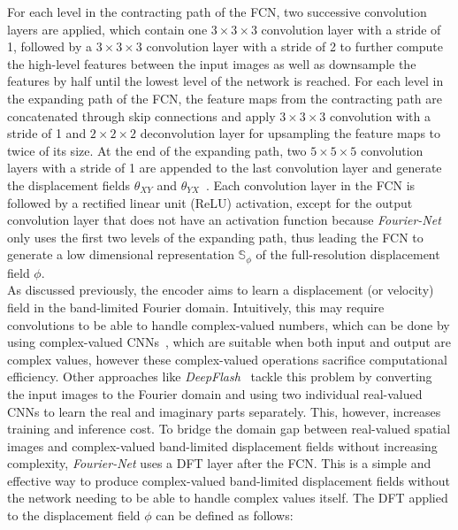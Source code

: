 For each level in the contracting path of the FCN, two successive convolution layers are applied, which contain one $3 \times 3 \times 3$ convolution layer with a stride of 1, followed by a $3 \times 3 \times 3$ convolution layer with a stride of 2 to further compute the high-level features between the input images as well as downsample the features by half until the lowest level of the network is reached. For each level in the expanding path of the FCN, the feature maps from the contracting path are concatenated through skip connections and apply $3 \times 3 \times 3$ convolution with a stride of 1 and $2 \times 2 \times 2$ deconvolution layer for upsampling the feature maps to twice of its size. At the end of the expanding path, two $5 \times 5 \times 5$ convolution layers with a stride of 1 are appended to the last convolution layer and generate the displacement fields $\theta_{XY}$ and $\theta_{YX}$~\cite{SYM-Net}. Each convolution layer in the FCN is followed by a rectified linear unit (ReLU) activation, except for the output convolution layer that does not have an activation function because \emph{Fourier-Net} only uses the first two levels of the expanding path, thus leading the FCN to generate a low dimensional representation $\mathbb{S}_\phi$ of the full-resolution displacement field $\phi$.\\
As discussed previously, the encoder aims to learn a displacement (or velocity) field in the band-limited Fourier domain. Intuitively, this may require convolutions to be able to handle complex-valued numbers, which can be done by using complex-valued CNNs~\cite{Trabelsi2017}, which are suitable when both input and output are complex values, however these complex-valued operations sacrifice computational efficiency. Other approaches like \emph{DeepFlash}~\cite{DeepFlash} tackle this problem by converting the input images to the Fourier domain and using two individual real-valued CNNs to learn the real and imaginary parts separately. This, however, increases training and inference cost. To bridge the domain gap between real-valued spatial images and complex-valued band-limited displacement fields without increasing complexity, \emph{Fourier-Net} uses a DFT layer after the FCN. This is a simple and effective way to produce complex-valued band-limited displacement fields without the network needing to be able to handle complex values itself. The DFT applied to the displacement field $\phi$ can be defined as follows:
